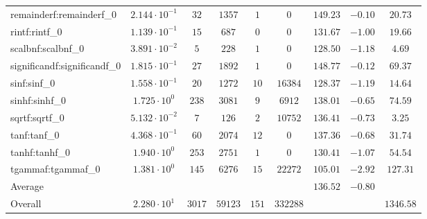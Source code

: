 \begin{tabular}{|l|c|c|c|c|c|c|c|c|}
remainderf:remainderf\_0     & $ 2.144 \cdot 10^{-1} $ & $ 32     $ & $ 1357  $ & $ 1   $ & $ 0      $ & $ 149.23      $ & $ -0.10   $ & $ 20.73   $ \\
rintf:rintf\_0               & $ 1.139 \cdot 10^{-1} $ & $ 15     $ & $ 687   $ & $ 0   $ & $ 0      $ & $ 131.67      $ & $ -1.00   $ & $ 19.66   $ \\
scalbnf:scalbnf\_0           & $ 3.891 \cdot 10^{-2} $ & $ 5      $ & $ 228   $ & $ 1   $ & $ 0      $ & $ 128.50      $ & $ -1.18   $ & $ 4.69    $ \\
significandf:significandf\_0 & $ 1.815 \cdot 10^{-1} $ & $ 27     $ & $ 1892  $ & $ 1   $ & $ 0      $ & $ 148.77      $ & $ -0.12   $ & $ 69.37   $ \\
sinf:sinf\_0                 & $ 1.558 \cdot 10^{-1} $ & $ 20     $ & $ 1272  $ & $ 10  $ & $ 16384  $ & $ 128.37      $ & $ -1.19   $ & $ 14.64   $ \\
sinhf:sinhf\_0               & $ 1.725 \cdot 10^{0}  $ & $ 238    $ & $ 3081  $ & $ 9   $ & $ 6912   $ & $ 138.01      $ & $ -0.65   $ & $ 74.59   $ \\
sqrtf:sqrtf\_0               & $ 5.132 \cdot 10^{-2} $ & $ 7      $ & $ 126   $ & $ 2   $ & $ 10752  $ & $ 136.41      $ & $ -0.73   $ & $ 3.25    $ \\
tanf:tanf\_0                 & $ 4.368 \cdot 10^{-1} $ & $ 60     $ & $ 2074  $ & $ 12  $ & $ 0      $ & $ 137.36      $ & $ -0.68   $ & $ 31.74   $ \\
tanhf:tanhf\_0               & $ 1.940 \cdot 10^{0}  $ & $ 253    $ & $ 2751  $ & $ 1   $ & $ 0      $ & $ 130.41      $ & $ -1.07   $ & $ 54.54   $ \\
tgammaf:tgammaf\_0           & $ 1.381 \cdot 10^{0}  $ & $ 145    $ & $ 6276  $ & $ 15  $ & $ 22272  $ & $ 105.01      $ & $ -2.92   $ & $ 127.31  $ \\
\hline
Average                      & $                     $ & $        $ & $       $ & $     $ & $        $ & $ 136.52      $ & $ -0.80   $ & $         $ \\
\hline
Overall                      & $ 2.280 \cdot 10^{1}  $ & $ 3017   $ & $ 59123 $ & $ 151 $ & $ 332288 $ & $             $ & $         $ & $ 1346.58 $ \\
\hline
\end{tabular}
